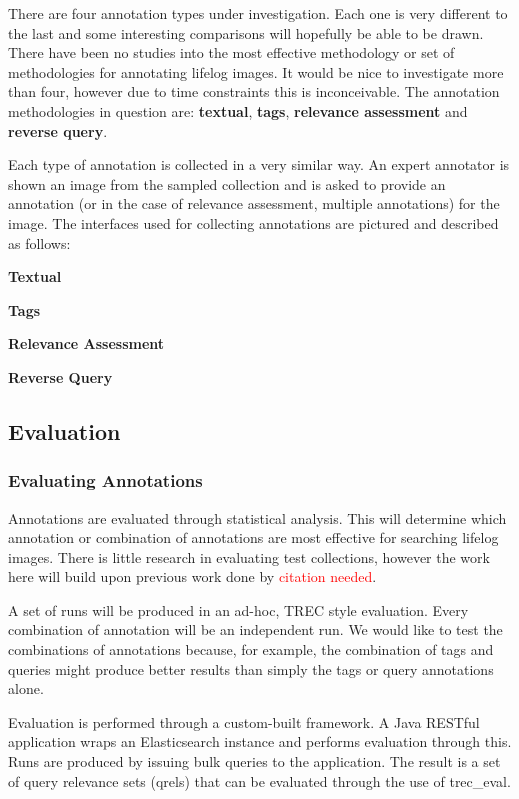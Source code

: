 \documentclass[12pt,a4paper]{article}
\newcommand\todo[1]{\textcolor{red}{#1}}
\begin{document}
There are four annotation types under investigation. Each one is very different to the last and some interesting comparisons will hopefully be able to be drawn. There have been no studies into the most effective methodology or set of methodologies for annotating lifelog images. It would be nice to investigate more than four, however due to time constraints this is inconceivable. The annotation methodologies in question are: \textbf{textual}, \textbf{tags}, \textbf{relevance assessment} and \textbf{reverse query}. 

Each type of annotation is collected in a very similar way. An expert annotator is shown an image from the sampled collection and is asked to provide an annotation (or in the case of relevance assessment, multiple annotations) for the image. The interfaces used for collecting annotations are pictured and described as follows:

\textbf{Textual}

\textbf{Tags}

\textbf{Relevance Assessment}

\textbf{Reverse Query}

\subsection{Evaluation}

\subsubsection{Evaluating Annotations}

Annotations are evaluated through statistical analysis. This will determine which annotation or combination of annotations are most effective for searching lifelog images. There is little research in evaluating test collections, however the work here will build upon previous work done by \todo{citation needed}.

A set of runs will be produced in an ad-hoc, TREC style evaluation. Every combination of annotation will be an independent run. We would like to test the combinations of annotations because, for example, the combination of tags and queries might produce better results than simply the tags or query annotations alone.

Evaluation is performed through a custom-built framework. A Java RESTful application wraps an Elasticsearch instance and performs evaluation through this. Runs are produced by issuing bulk queries to the application. The result is a set of query relevance sets (qrels) that can be evaluated through the use of trec\_eval.
\end{document}
